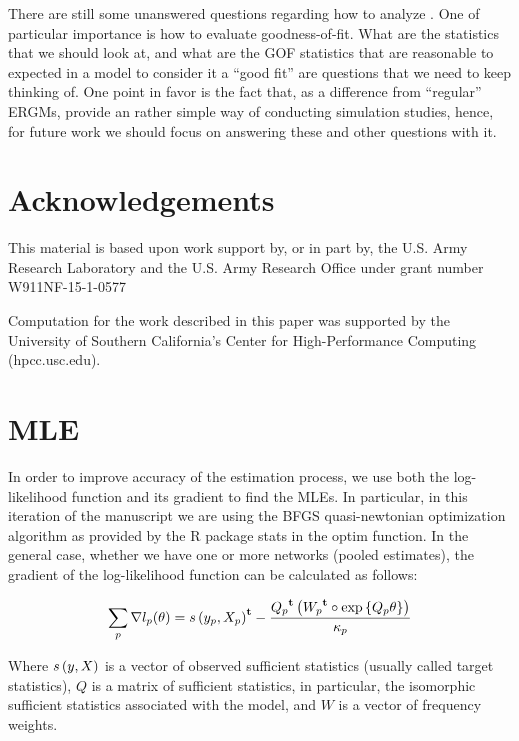\documentclass[12pt]{article}
\begin{document}
There are still some unanswered questions regarding how to analyze \ergmitos{}. One of particular importance is how to evaluate goodness-of-fit. What are the statistics that we should look at, and what are the GOF statistics that are reasonable to expected in a model to consider it a ``good fit'' are questions that we need to keep thinking of. One point in favor is the fact that, as a difference from ``regular'' ERGMs, \ergmitos{} provide an rather simple way of conducting simulation studies, hence, for future work we should focus on answering these and other questions with it.

\section{Acknowledgements}

This material is based upon work support by, or in part by, the U.S. Army Research Laboratory and the U.S. Army Research Office under grant number W911NF-15-1-0577

Computation for the work described in this paper was supported by the University of Southern California’s Center for High-Performance Computing (hpcc.usc.edu).

\clearpage


\nocite{vegayon2019,R,butts2016}


\clearpage

\appendix

\section{MLE}

In order to improve accuracy of the estimation process, we use both the log-likelihood function and its gradient to find the MLEs. In particular, in this iteration of the manuscript we are using the BFGS quasi-newtonian optimization algorithm as provided by the R package stats in the optim function. In the general case, whether we have one or more networks (pooled estimates), the gradient of the log-likelihood function can be calculated as follows:

\begin{equation}
\sum_{p}\nabla l_p(\theta) = {s\left(y_p, X_p\right)}^\mathbf{t} - \frac{{Q_p}^\mathbf{t}\left({W_p}^\mathbf{t} \circ \mbox{exp}\left\{Q_p \theta\right\}\right)}{\kappa_p}
\end{equation}

Where $s\left(y, X\right)$ is a vector of observed sufficient statistics (usually called target statistics), $Q$ is a matrix of sufficient statistics, in particular, the isomorphic sufficient statistics associated with the model, and $W$ is a vector of frequency weights.
\end{document}
